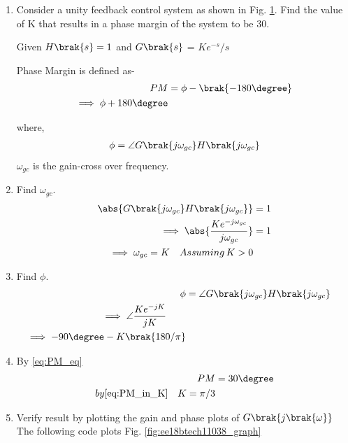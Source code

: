 \begin{enumerate}[label=\thesubsection.\arabic*.,ref=\thesubsection.\theenumi]

\item
Consider a unity feedback control system as shown in Fig.  \ref{fig:ee18btech11038}. Find the value of K that results in a phase margin of the system to be 30\degree.

\begin{figure}[!ht]
	\begin{center}
		
		\resizebox{\columnwidth}{!}{}
	\end{center}
\caption{}
\label{fig:ee18btech11038}
\end{figure}

\solution Given $H\brak{s} = 1$ and $G\brak{s}$ = ${Ke^{-s}}/s$

Phase Margin is defined as-
\begin{align}
\label{eq:PM_eq}
 PM &=\phi -\brak{-180\degree}
\\
\implies \phi + 180\degree 
\end{align}

where, 
\begin{align}
\label{eq:crossover_eq}
\phi = \angle G\brak{j\omega_{gc}}H\brak{j\omega_{gc}}
\end{align}
$\omega_{gc}$ is the gain-cross over frequency.

\item Find $\omega_{gc}$.
\\
\solution
\begin{align}
\abs{G\brak{j\omega_{gc}}H\brak{j\omega_{gc}}} &= 1
\\
\implies \abs{\frac{{Ke^{-j\omega_{gc}}}}{j\omega_{gc}}} &= 1
\\
\implies \omega_{gc} = K  \quad Assuming\, K>0
\end{align}
\item Find $\phi$.
\\
\solution 
\begin{align}
\label{eq:PM_in_K}
\phi &= \angle G\brak{j\omega_{gc}}H\brak{j\omega_{gc}} \quad
\\
\implies \angle \frac{{Ke^{-jK}}}{jK} \quad\quad
\\
\implies -90\degree - K\brak{180/\pi}
\end{align}
\item By \eqref{eq:PM_eq}
\begin{align}
    PM &= 30\degree
    \\
    by \eqref{eq:PM_in_K} \quad K = \pi/3
\end{align}
\item Verify result by plotting the gain and phase plots of $G\brak{j\brak{\omega}}$ 
\\
\solution The following code plots Fig. \ref{fig:ee18btech11038_graph}


\end{enumerate}
